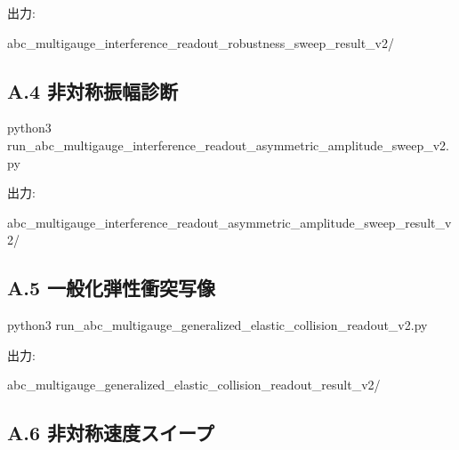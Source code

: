 \documentclass[
  a4paper,
]{article}
\newenvironment{Shaded}{}{}
\newcommand{\NormalTok}[1]{#1}
\begin{document}
出力:

\begin{Shaded}
\begin{Highlighting}[]
\NormalTok{abc\_multigauge\_interference\_readout\_robustness\_sweep\_result\_v2/}
\end{Highlighting}
\end{Shaded}

\subsection{A.4
非対称振幅診断}\label{a.4-ux975eux5bfeux79f0ux632fux5e45ux8a3aux65ad}

\begin{Shaded}
\begin{Highlighting}[]
\NormalTok{python3 run\_abc\_multigauge\_interference\_readout\_asymmetric\_amplitude\_sweep\_v2.py}
\end{Highlighting}
\end{Shaded}

出力:

\begin{Shaded}
\begin{Highlighting}[]
\NormalTok{abc\_multigauge\_interference\_readout\_asymmetric\_amplitude\_sweep\_result\_v2/}
\end{Highlighting}
\end{Shaded}

\subsection{A.5
一般化弾性衝突写像}\label{a.5-ux4e00ux822cux5316ux5f3eux6027ux885dux7a81ux5199ux50cf}

\begin{Shaded}
\begin{Highlighting}[]
\NormalTok{python3 run\_abc\_multigauge\_generalized\_elastic\_collision\_readout\_v2.py}
\end{Highlighting}
\end{Shaded}

出力:

\begin{Shaded}
\begin{Highlighting}[]
\NormalTok{abc\_multigauge\_generalized\_elastic\_collision\_readout\_result\_v2/}
\end{Highlighting}
\end{Shaded}

\subsection{A.6
非対称速度スイープ}\label{a.6-ux975eux5bfeux79f0ux901fux5ea6ux30b9ux30a4ux30fcux30d7}
\end{document}

